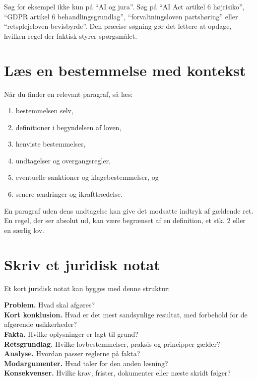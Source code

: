 Søg for eksempel ikke kun på ``AI og jura''. Søg på ``AI Act artikel 6 højrisiko'', ``GDPR artikel 6 behandlingsgrundlag'', ``forvaltningsloven partshøring'' eller ``retsplejeloven bevisbyrde''. Den præcise søgning gør det lettere at opdage, hvilken regel der faktisk styrer spørgsmålet.

\section{Læs en bestemmelse med kontekst}

Når du finder en relevant paragraf, så læs:
\begin{enumerate}
  \item bestemmelsen selv,
  \item definitioner i begyndelsen af loven,
  \item henviste bestemmelser,
  \item undtagelser og overgangsregler,
  \item eventuelle sanktioner og klagebestemmelser, og
  \item senere ændringer og ikrafttrædelse.
\end{enumerate}

En paragraf uden dens undtagelse kan give det modsatte indtryk af gældende ret. En regel, der ser absolut ud, kan være begrænset af en definition, et stk. 2 eller en særlig lov.

\section{Skriv et juridisk notat}

Et kort juridisk notat kan bygges med denne struktur:

\begin{methodbox}
\textbf{Problem.} Hvad skal afgøres?\\
\textbf{Kort konklusion.} Hvad er det mest sandsynlige resultat, med forbehold for de afgørende usikkerheder?\\
\textbf{Fakta.} Hvilke oplysninger er lagt til grund?\\
\textbf{Retsgrundlag.} Hvilke lovbestemmelser, praksis og principper gælder?\\
\textbf{Analyse.} Hvordan passer reglerne på fakta?\\
\textbf{Modargumenter.} Hvad taler for den anden løsning?\\
\textbf{Konsekvenser.} Hvilke krav, frister, dokumenter eller næste skridt følger?
\end{methodbox}

